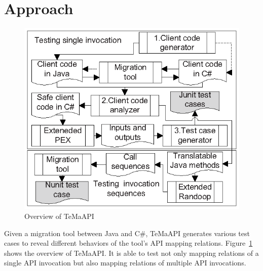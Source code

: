 \section{Approach}
\label{sec:approach}
\begin{figure}[t]
\centering
\includegraphics[scale=1,clip]{figure/approach.eps}\vspace*{-3ex}
 \caption{Overview of TeMaAPI}\vspace*{-4ex}
 \label{fig:approach}
\end{figure}
Given a migration tool between Java and C\#, TeMaAPI generates various test cases to reveal different behaviors of the tool's API mapping relations.
Figure~\ref{fig:approach} shows the overview of TeMaAPI. It is able to test not only mapping relations of a single API invocation but also mapping relations of multiple API invocations.


